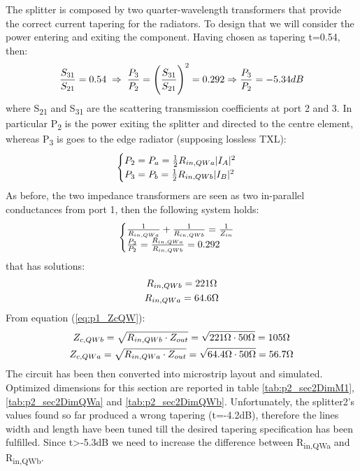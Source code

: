 The splitter is composed by two quarter-wavelength transformers that provide the correct current tapering for the radiators. To design that we will consider the power entering and exiting the component.
Having chosen as tapering t=0.54, then:
\begin{equation}
	\frac{S_{31}}{S_{21}}=0.54 \; \Rightarrow \; \frac{P_3}{P_2}=\Bigg(\frac{S_{31}}{S_{21}}\Bigg)^2=0.292 \Rightarrow \frac{P_3}{P_2}=-5.34dB \notag
\end{equation} 
where S\textsubscript{21} and S\textsubscript{31} are the scattering transmission coefficients at port 2 and 3. In particular P\textsubscript{2} is the power exiting the splitter and directed to the centre element, whereas P\textsubscript{3} is goes to the edge radiator (supposing lossless TXL):
\begin{equation}
	\begin{cases}
		P_2 = P_a = \frac{1}{2}R_{in,QWa}|I_A|^2 \notag \\	
		P_3 = P_b = \frac{1}{2}R_{in,QWb}|I_B|^2 \notag	
	\end{cases}	
\end{equation}
As before, the two impedance transformers are seen as two in-parallel conductances from port 1, then the following system holds: 
\begin{equation}
	\begin{cases} 
		\frac{1}{R_{in,QWa}}+\frac{1}{R_{in,QWb}}=\frac{1}{Z_{in}} \notag\\
		\frac{P_{3}}{P_{2}}=\frac{R_{in,QWa}}{R_{in,QWb}}=0.292 \notag
	\end{cases}
\end{equation}
that has solutions:
\begin{gather}
	R_{in,QWb} = 221\Omega \notag \\
	R_{in,QWa} = 64.6\Omega \notag
\end{gather}
From equation (\ref{eq:p1_ZcQW}):
\begin{gather}
	Z_{c,QWb}=\sqrt{R_{in,QWb}\cdot Z_{out}}=\sqrt{221\Omega \cdot 50\Omega}=105\Omega \notag \\
	Z_{c,QWa}=\sqrt{R_{in,QWa}\cdot Z_{out}}=\sqrt{64.4\Omega \cdot 50\Omega}=56.7\Omega \notag
\end{gather}
The circuit has been then converted into microstrip layout and simulated. Optimized dimensions for this section are reported in table \ref{tab:p2_sec2DimM1}, \ref{tab:p2_sec2DimQWa} and \ref{tab:p2_sec2DimQWb}.
Unfortunately, the splitter2's values found so far produced a wrong tapering (t=-4.2dB), therefore the lines width and length have been tuned till the desired tapering specification has been fulfilled. Since t>-5.3dB we need to increase the difference between R\textsubscript{in,QWa} and R\textsubscript{in,QWb}. 
